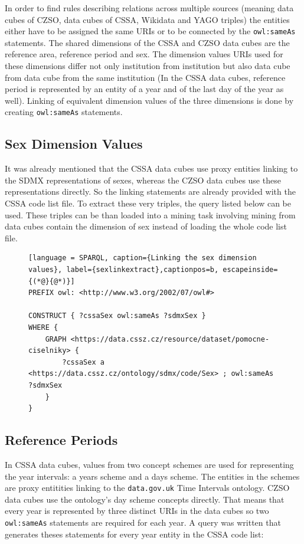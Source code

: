 In order to find rules describing relations across multiple sources (meaning data cubes of CZSO, data cubes of CSSA, Wikidata and YAGO triples) the entities either have to be assigned the same URIs or to be connected by the \verb|owl:sameAs| statements. The shared dimensions of the CSSA and CZSO data cubes are the reference area, reference period and sex. The dimension values URIs used for these dimensions differ not only institution from institution but also data cube from data cube from the same institution (In the CSSA data cubes, reference period is represented by an entity of a year and of the last day of the year as well). Linking of equivalent dimension values of the three dimensions is done by creating \verb|owl:sameAs| statements.

\subsection{Sex Dimension Values}

It was already mentioned that the CSSA data cubes use proxy entities linking to the SDMX representations of sexes, whereas the CZSO data cubes use these representations directly. So the linking statements are already provided with the CSSA code list file. To extract these very triples, the query listed below can be used. These triples can be than loaded into a mining task involving mining from data cubes contain the dimension of sex instead of loading the whole code list file.

\begin{figure}[h]
\begin{lstlisting}[language = SPARQL, caption={Linking the sex dimension values}, label={sexlinkextract},captionpos=b, escapeinside={(*@}{@*)}]
PREFIX owl: <http://www.w3.org/2002/07/owl#>

CONSTRUCT { ?cssaSex owl:sameAs ?sdmxSex }
WHERE {
    GRAPH <https://data.cssz.cz/resource/dataset/pomocne-ciselniky> {
        ?cssaSex a <https://data.cssz.cz/ontology/sdmx/code/Sex> ; owl:sameAs ?sdmxSex
    }
}
\end{lstlisting}
\end{figure}

\subsection{Reference Periods}

In CSSA data cubes, values from two concept schemes are used for representing the year intervals: a years scheme and a days scheme. The entities in the schemes are proxy entitities linking to the \verb|data.gov.uk| Time Intervals ontology. CZSO data cubes use the ontology's day scheme concepts directly. That means that every year is represented by three distinct URIs in the data cubes so two \verb|owl:sameAs| statements are required for each year. A query was written that generates theses statements for every year entity in the CSSA code list:

